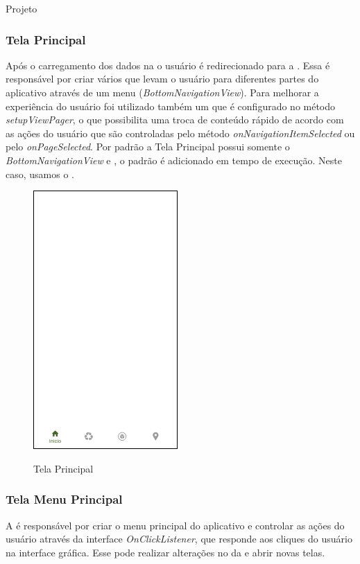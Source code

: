\documentclass[
	12pt,				%
	openany,			%
	twoside,			%
	a4paper,			%
	english,			%
	french,				%
	spanish,			%
	brazil				%
	]{abntex2}
\begin{document}
\begin{chapter}{Projeto}
\subsubsection{Tela Principal} \label{main_activity}
Após o carregamento dos dados na  o usuário é redirecionado para a . Essa  é responsável por criar vários  que levam o usuário para diferentes partes do aplicativo através de um menu (\textit{BottomNavigationView}). Para melhorar a experiência do usuário foi utilizado também um  que é configurado no método \textit{setupViewPager}, o que possibilita uma troca de conteúdo rápido de acordo com as ações do usuário que são controladas pelo método \textit{onNavigationItemSelected} ou pelo \textit{onPageSelected}. Por padrão a Tela Principal possui somente o \textit{BottomNavigationView} e , o  padrão é adicionado em tempo de execução. Neste caso, usamos o .


\begin{figure}[h]
\centering
   \caption{Tela Principal}
   \includegraphics[scale=1.0]{media/activity_main.png}
     \label{fig:activity_main_app}
\end{figure}

\newpage
\subsubsection{Tela Menu Principal} \label{main_fragment}
A  é responsável por criar o menu principal do aplicativo e controlar as ações do usuário através da interface \textit{OnClickListener}, que responde aos cliques do usuário na interface gráfica. Esse  pode realizar alterações no  da  e abrir novas telas.


\end{chapter}
\end{document}
